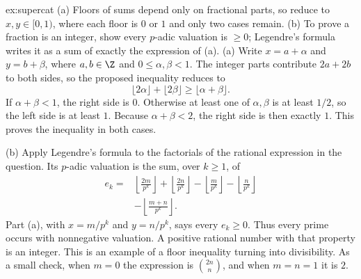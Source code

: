 \begin{solution}{ex:supercat}
\idea (a) Floors of sums depend only on fractional parts, so reduce to $x,y\in[0,1)$, where each floor is $0$ or $1$ and only two cases remain. (b) To prove a fraction is an integer, show every $p$-adic valuation is $\ge0$; Legendre's formula writes it as a sum of exactly the expression of (a).
\writeup (a) Write $x=a+\alpha$ and $y=b+\beta$, where $a,b\in\Z$ and $0\le\alpha,\beta<1$. The integer parts contribute $2a+2b$ to both sides, so the proposed inequality reduces to
\[
\lfloor2\alpha\rfloor+\lfloor2\beta\rfloor
\ge\lfloor\alpha+\beta\rfloor.
\]
If $\alpha+\beta<1$, the right side is $0$. Otherwise at least one of $\alpha,\beta$ is at least $1/2$, so the left side is at least $1$. Because $\alpha+\beta<2$, the right side is then exactly $1$. This proves the inequality in both cases.

(b) Apply Legendre's formula to the factorials of the rational expression in the question. Its $p$-adic valuation is the sum, over $k\ge1$, of
\[
\begin{aligned}
e_k={}&\left\lfloor\frac{2m}{p^k}\right\rfloor
+\left\lfloor\frac{2n}{p^k}\right\rfloor
-\left\lfloor\frac m{p^k}\right\rfloor
-\left\lfloor\frac n{p^k}\right\rfloor\\
&-\left\lfloor\frac{m+n}{p^k}\right\rfloor.
\end{aligned}
\]
Part (a), with $x=m/p^k$ and $y=n/p^k$, says every $e_k\ge0$. Thus every prime occurs with nonnegative valuation. A positive rational number with that property is an integer. This is an example of a floor inequality turning into divisibility. As a small check, when $m=0$ the expression is $\binom{2n}{n}$, and when $m=n=1$ it is $2$.
\end{solution}

